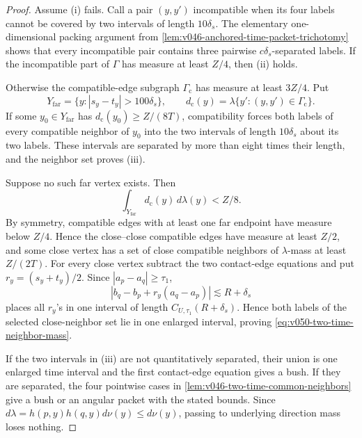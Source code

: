 \documentclass[10pt]{article}
\begin{document}
\begin{proof}
Assume \textnormal{(i)} fails.  Call a pair \((y,y')\) incompatible when its four labels cannot be
covered by two intervals of length \(10\delta_s\).  The elementary one-dimensional packing argument
from \cref{lem:v046-anchored-time-packet-trichotomy} shows that every incompatible pair contains
three pairwise \(c\delta_s\)-separated labels.  If the incompatible part of \(\Gamma\) has measure at
least \(Z/4\), then \textnormal{(ii)} holds.

Otherwise the compatible-edge subgraph \(\Gamma_{\mathrm c}\) has measure at least \(3Z/4\).  Put
\[
Y_{\mathrm{far}}
=
\{y:|s_y-t_y|>100\delta_s\},
\qquad
d_{\mathrm c}(y)
=
\lambda\{y':(y,y')\in\Gamma_{\mathrm c}\}.
\]
If some \(y_0\in Y_{\mathrm{far}}\) has
\(d_{\mathrm c}(y_0)\ge Z/(8T)\), compatibility forces both labels of every compatible neighbor of
\(y_0\) into the two intervals of length \(10\delta_s\) about its two labels.  These intervals are
separated by more than eight times their length, and the neighbor set proves \textnormal{(iii)}.

Suppose no such far vertex exists.  Then
\[
\int_{Y_{\mathrm{far}}}d_{\mathrm c}(y)\,d\lambda(y)
<
Z/8.
\]
By symmetry, compatible edges with at least one far endpoint have measure below \(Z/4\).  Hence the
close--close compatible edges have measure at least \(Z/2\), and some close vertex has a set of close
compatible neighbors of \(\lambda\)-mass at least \(Z/(2T)\).  For every close vertex subtract the
two contact-edge equations and put \(r_y=(s_y+t_y)/2\).  Since
\(|a_p-a_q|\ge\tau_1\),
\[
|b_q-b_p+r_y(a_q-a_p)|
\lesssim
R+\delta_s
\]
places all \(r_y\)'s in one interval of length
\(C_{U,\tau_1}(R+\delta_s)\).  Hence both labels of the selected close-neighbor set lie in one
enlarged interval, proving \eqref{eq:v050-two-time-neighbor-mass}.

If the two intervals in \textnormal{(iii)} are not quantitatively separated, their union is one
enlarged time interval and the first contact-edge equation gives a bush.  If they are separated, the
four pointwise cases in \cref{lem:v046-two-time-common-neighbors} give a bush or an angular packet
with the stated bounds.  Since
\(d\lambda=h(p,y)h(q,y)d\nu(y)\le d\nu(y)\), passing to underlying direction mass loses nothing.
\end{proof}
\end{document}
